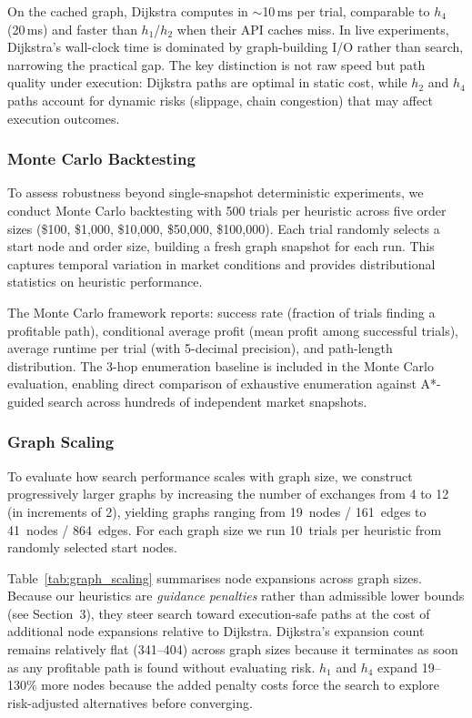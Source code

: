 On the cached graph, Dijkstra computes in ${\sim}$10\,ms per trial, comparable to $h_4$ (20\,ms) and faster than $h_1$/$h_2$ when their API caches miss. In live experiments, Dijkstra's wall-clock time is dominated by graph-building I/O rather than search, narrowing the practical gap. The key distinction is not raw speed but path quality under execution: Dijkstra paths are optimal in static cost, while $h_2$ and $h_4$ paths account for dynamic risks (slippage, chain congestion) that may affect execution outcomes.

\subsubsection{Monte Carlo Backtesting}
\label{sec:mc_experiments}

To assess robustness beyond single-snapshot deterministic experiments, we conduct Monte Carlo backtesting with 500 trials per heuristic across five order sizes (\$100, \$1,000, \$10,000, \$50,000, \$100,000). Each trial randomly selects a start node and order size, building a fresh graph snapshot for each run. This captures temporal variation in market conditions and provides distributional statistics on heuristic performance.

The Monte Carlo framework reports: success rate (fraction of trials finding a profitable path), conditional average profit (mean profit among successful trials), average runtime per trial (with 5-decimal precision), and path-length distribution. The 3-hop enumeration baseline is included in the Monte Carlo evaluation, enabling direct comparison of exhaustive enumeration against A*-guided search across hundreds of independent market snapshots.

\subsubsection{Graph Scaling}
\label{sec:graph_scaling}

To evaluate how search performance scales with graph size, we construct progressively larger graphs by increasing the number of exchanges from 4 to 12 (in increments of 2), yielding graphs ranging from 19~nodes / 161~edges to 41~nodes / 864~edges. For each graph size we run 10~trials per heuristic from randomly selected start nodes.

Table~\ref{tab:graph_scaling} summarises node expansions across graph sizes. Because our heuristics are \emph{guidance penalties} rather than admissible lower bounds (see Section~3), they steer search toward execution-safe paths at the cost of additional node expansions relative to Dijkstra. Dijkstra's expansion count remains relatively flat (341--404) across graph sizes because it terminates as soon as any profitable path is found without evaluating risk. $h_1$ and $h_4$ expand 19--130\% more nodes because the added penalty costs force the search to explore risk-adjusted alternatives before converging.

